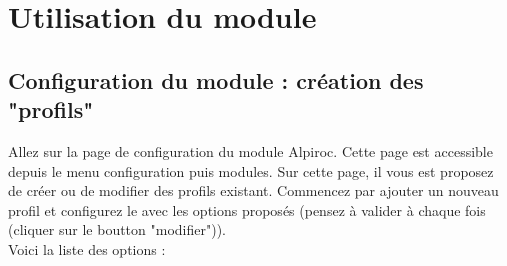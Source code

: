 \documentclass[a4paper,11pt]{article}
\begin{document}
\section{Utilisation du module}

\subsection{Configuration du module : création des "profils"}
Allez sur la page de configuration du module Alpiroc. Cette page est accessible depuis le menu configuration puis modules. Sur cette page, il vous est proposez de créer ou de modifier des profils existant. Commencez par ajouter un nouveau profil et configurez le avec les options proposés (pensez à valider à chaque fois (cliquer sur le boutton "modifier")).\\
Voici la liste des options :
\end{document}
